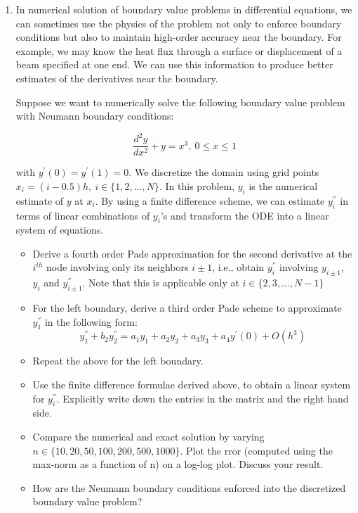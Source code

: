 \documentclass{article}
\begin{document}
\begin{enumerate}
\item In numerical solution of boundary value problems in differential equations, we can
sometimes use the physics of the problem not only to enforce boundary conditions but also
to maintain high-order accuracy near the boundary. For example, we may know the heat flux
through a surface or displacement of a beam specified at one end. We can use this
information to produce better estimates of the derivatives near the boundary.

Suppose we want to numerically solve the following boundary value problem with Neumann
boundary conditions:

\begin{equation*}
    \frac{d^{2} y}{dx^{2}} + y = x^{3}, \ 0 \leq x \leq 1
\end{equation*}

with $y^{'}(0) = y^{'}(1) = 0$. We discretize the domain using grid points $x_{i} = 
(i - 0.5)h, \ i \in \{1,2,...,N\}$. In this problem, $y_{i}$ is the numerical estimate of 
$y$ at $x_{i}$. By using a finite difference scheme, we can estimate $y_{i}^{''}$ in terms 
of linear combinations of $y_{i}$'s and transform the ODE into a linear system of equations.

\begin{itemize}

    \item Derive a fourth order Pade approximation for the second derivative at the
        $i^{th}$ node involving only its neighbors $i \pm 1$, i.e., obtain $y_{i}^{''}$
        involving $y_{i \pm 1}$, $y_{i}$ and $y_{i \pm 1}^{''}$. Note that this is
        applicable only at $i \in \{2,3,...,N-1\}$

    \item For the left boundary, derive a third order Pade scheme to approximate
        $y_{1}^{''}$ in the following form:
        \begin{equation*}
            y_{1}^{''} + b_{2} y_{2}^{''} = a_{1}y_{1} + a_{2}y_{2} + a_{3}y_{3} +
            a_{4}y^{'}(0) + O(h^{3})
        \end{equation*}

    \item Repeat the above for the left boundary.

    \item Use the finite difference formulae derived above, to obtain a linear system for
        $y_{i}^{''}$. Explicitly write down the entries in the matrix and the right hand
        side.

    \item Compare the numerical and exact solution by varying $n \in
        \{10,20,50,100,200,500,1000\}$. Plot the rror (computed using the max-norm as a
        function of n) on a log-log plot. Discuss your result.

    \item How are the Neumann boundary conditions enforced into the discretized boundary
        value problem?

\end{itemize}

\end{enumerate}
\end{document}
